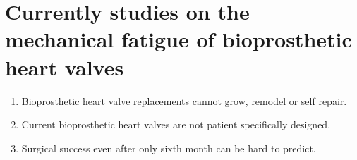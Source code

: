 \section{Currently studies on the mechanical fatigue of bioprosthetic heart valves}


\begin{enumerate}
\item Bioprosthetic heart valve replacements cannot grow, remodel or self repair.
\item Current bioprosthetic heart valves are not patient specifically designed. 
\item Surgical success even after only sixth month can be hard to predict. 
\end{enumerate}


